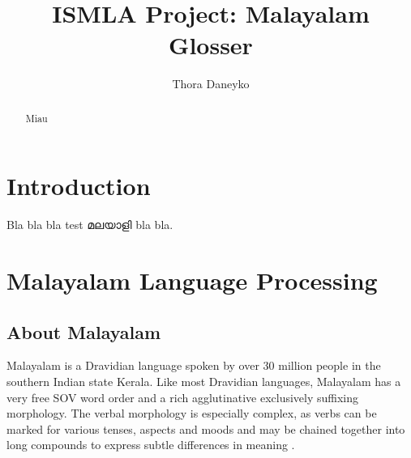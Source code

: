 \documentclass[a4paper]{article}
\author{Thora Daneyko}
\title{ISMLA Project: Malayalam Glosser}
\begin{document}
\maketitle

\begin{abstract}
Miau
\end{abstract}


\begingroup
{}

\section{Introduction}

Bla bla bla test മലയാളി bla bla.

\section{Malayalam Language Processing}\label{malnlp}

\subsection{About Malayalam}

Malayalam is a Dravidian language spoken by over 30 million people in the southern Indian state Kerala. Like most Dravidian languages, Malayalam has a very free SOV word order and a rich agglutinative exclusively suffixing morphology. The verbal morphology is especially complex, as verbs can be marked for various tenses, aspects and moods and may be chained together into long compounds to express subtle differences in meaning \parencite{asherKumari}.
\end{document}
